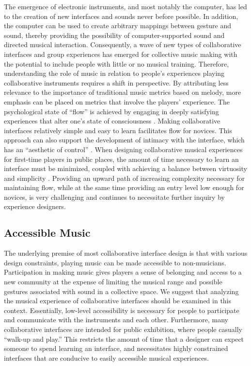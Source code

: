 The emergence of electronic instruments, and most notably the computer, has led
to the creation of new interfaces and sounds never before possible.  In addition,
the computer can be used to create arbitrary mappings between gesture and sound,
thereby providing the possibility of computer-supported sound and directed
musical interaction. Consequently, a wave of new types of collaborative
interfaces and group experiences has emerged for collective music making with the
potential to include people with little or no musical training. Therefore,
understanding the role of music in relation to people's experiences playing
collaborative instruments requires a shift in perspective.  By attributing less
relevance to the importance of traditional music metrics based on melody, more
emphasis can be placed on metrics that involve the players' experience. The
psychological state of ``flow'' is achieved by engaging in deeply satisfying
experiences that alter one's state of consciousness \cite{Csikszentmihalyi:1990}. Making collaborative
interfaces relatively simple and easy to learn facilitates flow for novices. This
approach can also support the development of intimacy with the interface, which
has an ``aesthetic of control'' \cite{Fels:2000}. When designing collaborative musical
experiences for first-time players in public places, the amount of time necessary
to learn an interface must be minimized, coupled with achieving a balance between
virtuosity and simplicity \cite{DArcangelo:2001}.  Providing an upward path of increasing complexity
necessary for maintaining flow, while at the same time providing an entry level
low enough for novices, is very challenging and continues to necessitate further
inquiry by experience designers.

\subsection{Accessible Music}

The underlying premise of most collaborative interface design is that with
various design constraints, playing music can be made accessible to
non-musicians. Participation in making music gives players a sense of belonging
and access to a new community at the expense of limiting the musical range and
possible gestures associated with sound in a collective space. We suggest that
analyzing the musical experience of collaborative interfaces should be examined
in this context. Essentially, low-level accessibility is necessary for people to
participate and communicate with the instruments and each other.  Furthermore,
many collaborative interfaces are intended for public exhibition, where people
casually ``walk-up and play.''  This restricts the amount of time that a designer
can expect someone to spend learning an interface, and necessitates highly
constrained interfaces that are conducive to easily accessible musical
experiences.

